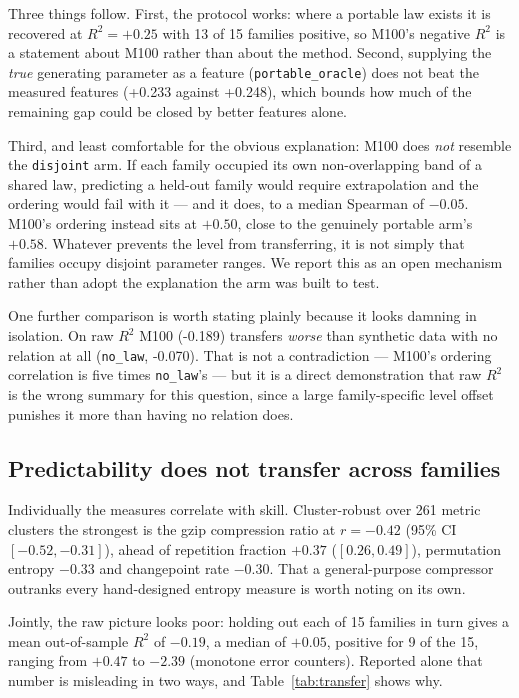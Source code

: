 \documentclass[11pt,a4paper]{article}
\newcommand{\num}[1]{#1}
\begin{document}
Three things follow. First, the protocol works: where a portable law exists it
is recovered at \(R^2 = +0.25\) with \num{13} of \num{15} families positive,
so M100's negative \(R^2\) is a statement about M100 rather than about the
method. Second, supplying the \emph{true} generating parameter as a feature
(\texttt{portable\_oracle}) does not beat the measured features
(\num{+0.233} against \num{+0.248}), which bounds how much of the remaining gap
could be closed by better features alone.

Third, and least comfortable for the obvious explanation: M100 does \emph{not}
resemble the \texttt{disjoint} arm. If each family occupied its own
non-overlapping band of a shared law, predicting a held-out family would require
extrapolation and the ordering would fail with it --- and it does, to a median
Spearman of \(-0.05\). M100's ordering instead sits at \(+0.50\), close to the
genuinely portable arm's \(+0.58\). Whatever prevents the level from
transferring, it is not simply that families occupy disjoint parameter ranges.
We report this as an open mechanism rather than adopt the explanation the arm
was built to test.

One further comparison is worth stating plainly because it looks damning in
isolation. On raw \(R^2\) M100 (\num{-0.189}) transfers \emph{worse} than
synthetic data with no relation at all (\texttt{no\_law}, \num{-0.070}). That
is not a contradiction --- M100's ordering correlation is five times
\texttt{no\_law}'s --- but it is a direct demonstration that raw \(R^2\) is the
wrong summary for this question, since a large family-specific level offset
punishes it more than having no relation does.

\subsection{Predictability does not transfer across families}
\label{sec:linking}

Individually the measures correlate with skill. Cluster-robust over \num{261}
metric clusters the strongest is the gzip compression ratio at \(r=-0.42\)
(95\% CI \([-0.52,-0.31]\)), ahead of repetition fraction \(+0.37\)
(\([0.26,0.49]\)), permutation entropy \(-0.33\) and changepoint rate
\(-0.30\). That a general-purpose compressor outranks every hand-designed
entropy measure is worth noting on its own.

Jointly, the raw picture looks poor: holding out each of \num{15} families in
turn gives a mean out-of-sample \(R^2\) of \(-0.19\), a median of \(+0.05\),
positive for \num{9} of the \num{15}, ranging from \(+0.47\) to \(-2.39\)
(monotone error counters). Reported alone that number is
misleading in two ways, and Table~\ref{tab:transfer} shows why.
\end{document}
